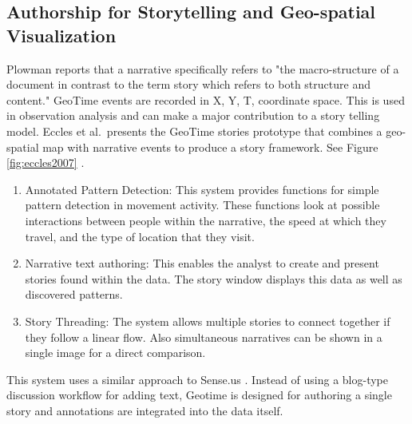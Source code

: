 \documentclass{egpubl}
\begin{document}
\subsection{Authorship for Storytelling and Geo-spatial Visualization}
%
Plowman \cite{plowman1999} reports that a narrative specifically refers to "the macro-structure of a document in contrast to the term story which refers to both structure and content."
GeoTime events are recorded in X, Y, T, coordinate space. This is used in observation analysis and can make a major contribution to a story telling model. Eccles et al.\ presents the GeoTime stories prototype that combines a geo-spatial map with narrative events to produce a story framework. See Figure \ref{fig:eccles2007} \cite{eccles2007}.
\begin{enumerate}
\item Annotated Pattern Detection: This system provides functions for simple pattern detection in movement activity. These functions look at possible interactions between people within the narrative, the speed at which they travel, and the type of location that they visit.
\item Narrative text authoring: This enables the analyst to create and present stories found within the data. The story window displays this data as well as discovered patterns. 
\item Story Threading: The system allows multiple stories to connect together if they follow a linear flow. Also simultaneous narratives can be shown in a single image for a direct comparison.
\end{enumerate}
 This system uses a similar approach to Sense.us \cite{heer2007a}. Instead of using a blog-type discussion workflow for adding text, Geotime is designed for authoring a single story and annotations are integrated into the data itself.
\end{document}
